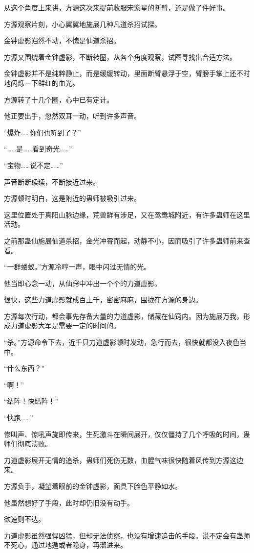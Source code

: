 \begin{this_body}
从这个角度上来讲，方源这次来提前收服宋紫星的断臂，还是做了件好事。

方源观察片刻，小心翼翼地施展几种凡道杀招试探。

金钟虚影岿然不动，不愧是仙道杀招。

方源又围绕着金钟虚影，不断转圈，从各个角度观察，试图寻找出合适方法。

金钟虚影并不是纯粹静止，而是缓缓转动，里面断臂悬浮于空，臂膀手掌上还不时地闪烁一下鲜红的血光。

方源转了十几个圈，心中已有定计。

他正要出手，忽然双耳一动，听到许多声音。

“爆炸……你们也听到了？”

“……是……看到奇光……”

“宝物……说不定……”

声音断断续续，不断接近过来。

方源顿时明白，这是附近的蛊师被吸引过来。

这里位置处于真阳山脉边缘，荒兽鲜有涉足，又在鸳鸯城附近，有许多蛊师在这里活动。

之前那蛊仙施展仙道杀招，金光冲霄而起，动静不小，因而吸引了许多蛊师前来查看。

“一群蝼蚁。”方源冷哼一声，眼中闪过无情的光。

他当即心念一动，从仙窍中冲出一个个的力道虚影。

很快，这些力道虚影就成百上千，密密麻麻，围拢在方源的身边。

方源每次行动，都会事先存备大量的力道虚影，储藏在仙窍内。因为施展万我，形成力道虚影大军是需要一定的时间的。

“杀。”方源命令下去，近千只力道虚影顿时发动，急行而去，很快就都没入夜色当中。

“什么东西？”

“啊！”

“结阵！快结阵！”

“快跑……”

惨叫声、惊吼声旋即传来，生死激斗在瞬间展开，仅仅僵持了几个呼吸的时间，蛊师们彻底溃败。

力道虚影展开无情的追杀，蛊师们死伤无数，血腥气味很快随着风传到方源这边来。

方源负手，凝望着眼前的金钟虚影，面具下脸色平静如水。

他虽然想好了手段，此时却仍旧没有动手。

欲速则不达。

力道虚影虽然强悍凶猛，但却无法侦察，也没有增速追击的手段。说不定会有蛊师不死心，通过地遁或者隐身，再溜进来。


\end{this_body}
